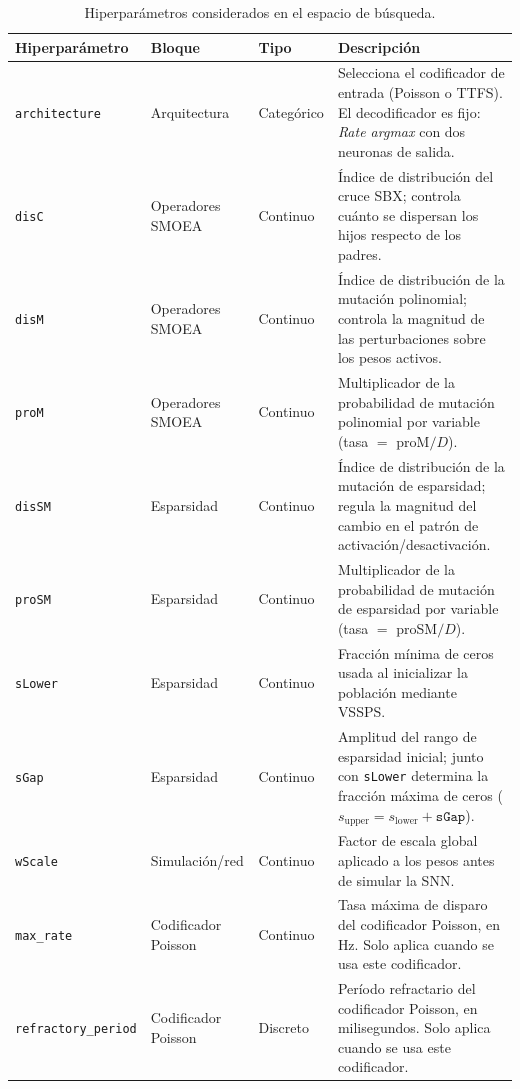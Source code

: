 \begin{table}
\centering
\small
\caption{Hiperparámetros considerados en el espacio de búsqueda.}
\label{tab:espacio-busqueda-hiper}
\begin{tabularx}{\linewidth}{lp{2cm}lX}
\hline
\textbf{Hiperparámetro} & \textbf{Bloque} & \textbf{Tipo} & \textbf{Descripción} \\
\hline
\texttt{architecture} & Arquitectura & Categórico & Selecciona el codificador de entrada (Poisson o TTFS). El decodificador es fijo: \textit{Rate argmax} con dos neuronas de salida. \\
\hline
\texttt{disC} & Operadores SMOEA & Continuo & Índice de distribución del cruce SBX; controla cuánto se dispersan los hijos respecto de los padres. \\
\hline
\texttt{disM} & Operadores SMOEA & Continuo & Índice de distribución de la mutación polinomial; controla la magnitud de las perturbaciones sobre los pesos activos. \\
\hline
\texttt{proM} & Operadores SMOEA & Continuo & Multiplicador de la probabilidad de mutación polinomial por variable (tasa $=$ proM$/D$). \\
\hline
\texttt{disSM} & Esparsidad & Continuo & Índice de distribución de la mutación de esparsidad; regula la magnitud del cambio en el patrón de activación/desactivación. \\
\hline
\texttt{proSM} & Esparsidad & Continuo & Multiplicador de la probabilidad de mutación de esparsidad por variable (tasa $=$ proSM$/D$). \\
\hline
\texttt{sLower} & Esparsidad & Continuo & Fracción mínima de ceros usada al inicializar la población mediante VSSPS. \\
\hline
\texttt{sGap} & Esparsidad & Continuo & Amplitud del rango de esparsidad inicial; junto con \texttt{sLower} determina la fracción máxima de ceros ($s_{\text{upper}} = s_{\text{lower}} + \texttt{sGap}$). \\
\hline
\texttt{wScale} & Simulación/red & Continuo & Factor de escala global aplicado a los pesos antes de simular la SNN. \\
\hline
\texttt{max\_rate} & Codificador Poisson & Continuo & Tasa máxima de disparo del codificador Poisson, en Hz. Solo aplica cuando se usa este codificador. \\
\hline
\texttt{refractory\_period} & Codificador Poisson & Discreto & Período refractario del codificador Poisson, en milisegundos. Solo aplica cuando se usa este codificador. \\
\hline
\end{tabularx}
\end{table}

